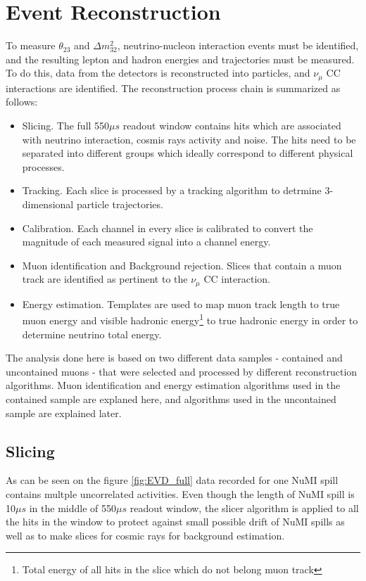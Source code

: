 \chapter{Event Reconstruction}
\label{reconstruction_chapter}

To measure $\theta_{23}$ and $\Delta m_{32}^2$, neutrino-nucleon interaction events must be identified, and the
resulting lepton and hadron energies and trajectories must be measured. To do this, data from the
detectors is reconstructed into particles, and $\nu_\mu$ CC interactions are identified. The
reconstruction process chain is summarized as follows:
\begin{itemize}
\item Slicing. The full 550$\mu s$ readout window contains hits which are associated with
neutrino interaction, cosmis rays activity and noise. The hits need to be separated into
different groups which ideally correspond to different physical processes.
\item Tracking.  Each slice is processed by a tracking algorithm to detrmine 3-dimensional particle
trajectories.
\item Calibration. Each channel in every slice is calibrated to convert the magnitude of each
measured signal into a channel energy.
\item Muon identification and Background rejection. Slices that contain a muon track are identified
as pertinent to the $\nu_\mu$ CC interaction.
\item Energy estimation. Templates are used to map muon track length to true muon energy and visible 
hadronic energy\footnote{Total energy of all hits in the slice which do not belong muon track} to true 
hadronic energy in order to determine neutrino total energy.  
\end{itemize}
The analysis done here is based on two different data samples - contained and uncontained muons -
that were selected and processed by different reconstruction algorithms. Muon identification and energy
estimation algorithms used in the contained sample are explaned here, and algorithms used in the uncontained
sample are explained later.

\section{Slicing}
As can be seen on the figure \ref{fig:EVD_full} data recorded for one NuMI spill contains
multple uncorrelated activities. Even though the length of NuMI spill is 10$\mu s$ in the middle
of 550$\mu s$ readout window, the slicer algorithm is applied to all the hits in the window to protect 
against small possible drift of NuMI spills as well as to make slices for cosmic rays for background
estimation.

